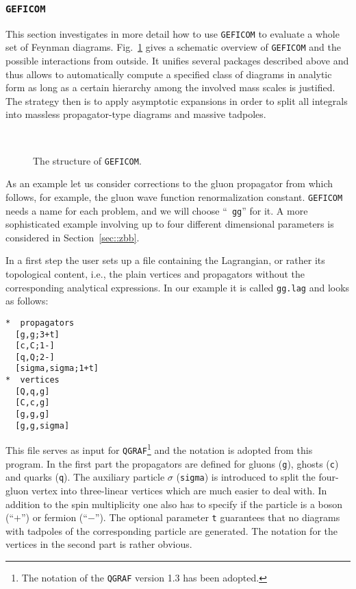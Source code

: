 %
\subsubsection{\label{subgeficom}{\tt GEFICOM}}
%
This section investigates in more detail how to use {\tt GEFICOM} to
evaluate a whole set of Feynman diagrams.  Fig.~\ref{figfchart} gives a
schematic overview of {\tt GEFICOM} and the possible interactions from
outside. It unifies several packages described above and thus allows to
automatically compute a specified class of diagrams in analytic form as
long as a certain hierarchy among the involved mass scales is justified.
The strategy then is to apply asymptotic expansions in order to split
all integrals into massless propagator-type diagrams and massive
tadpoles.

\begin{figure}[ht]
  \begin{center}
    \leavevmode
    \epsfxsize=8cm
    \\
    \parbox{\captionwidth}{
      \caption[]{\label{figfchart}The structure of {\tt GEFICOM}.
        }}
  \end{center}
\end{figure}


As an example let us consider corrections to the gluon propagator from
which follows, for example, the gluon wave function renormalization constant.
{\tt GEFICOM} needs a name for each problem, and we will choose ``{\tt
  gg}'' for it.  A more sophisticated example involving up to four
different dimensional parameters is considered in Section~\ref{sec::zbb}.

In a first step the user sets up a file containing the
Lagrangian, or rather its topological content, i.e., the plain
vertices and propagators without the corresponding analytical expressions.
In our example it is called {\tt gg.lag} and looks as follows:
\begin{verbatim}
*  propagators 
  [g,g;3+t]
  [c,C;1-]
  [q,Q;2-]
  [sigma,sigma;1+t]
*  vertices
  [Q,q,g]
  [C,c,g]
  [g,g,g]
  [g,g,sigma]
\end{verbatim}
This file serves as input for {\tt QGRAF}\footnote{The notation of the
  {\tt QGRAF} version 1.3 has been adopted.}  and the notation is
adopted from this program.  In the first part the propagators are
defined for gluons (\verb/g/), ghosts (\verb/c/) and quarks (\verb/q/).
The auxiliary particle $\sigma$ (\verb/sigma/) is introduced to split
the four-gluon vertex into three-linear vertices which are much easier
to deal with.  In addition to the spin multiplicity one also has to
specify if the particle is a boson (``$+$'') or fermion (``$-$''). The
optional parameter \verb/t/ guarantees that no diagrams with tadpoles of
the corresponding particle are generated.  The notation for the vertices
in the second part is rather obvious.

